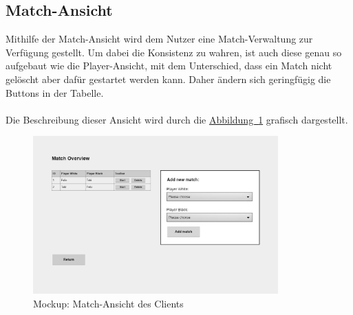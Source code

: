 \subsection{Match-Ansicht}\label{sec:matchView}
Mithilfe der Match-Ansicht wird dem Nutzer eine Match-Verwaltung zur Verfügung gestellt. Um dabei die Konsistenz zu wahren, ist auch diese genau so aufgebaut wie die Player-Ansicht, mit dem Unterschied, dass ein Match nicht gelöscht aber dafür gestartet werden kann. Daher ändern sich geringfügig die Buttons in der Tabelle.\\
\\
Die Beschreibung dieser Ansicht wird durch die \hyperref[fig:matchView]{Abbildung~\ref{fig:matchView}} grafisch dargestellt.
\begin{figure}[htb]
	\includegraphics[width=0.84\textwidth]{images/match-view.png}
	\caption{Mockup: Match-Ansicht des Clients}
	\label{fig:matchView}
\end{figure}

